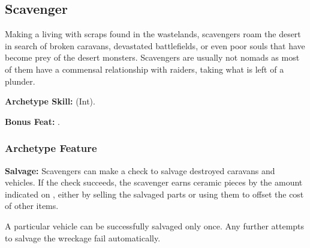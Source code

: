 \subsection{Scavenger}
Making a living with scraps found in the wastelands, scavengers roam the desert in search of broken caravans, devastated battlefields, or even poor souls that have become prey of the desert monsters. Scavengers are usually not nomads as most of them have a commensal relationship with raiders, taking what is left of a plunder.

\textbf{Archetype Skill:}  (Int).

\textbf{Bonus Feat:} .

\subsubsection{Archetype Feature}
\textbf{Salvage:} Scavengers can make a  check to salvage destroyed caravans and vehicles. If the check succeeds, the scavenger earns ceramic pieces by the amount indicated on , either by selling the salvaged parts or using them to offset the cost of other items.

A particular vehicle can be successfully salvaged only once. Any further attempts to salvage the wreckage fail automatically.


